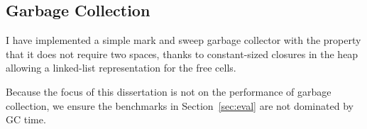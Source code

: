 \subsection{Garbage Collection}

I have implemented a simple mark and sweep garbage collector with the property
that it does not require two spaces, thanks to constant-sized closures in the
heap allowing a linked-list representation for the free cells. 

Because the focus of this dissertation is not on the performance of garbage
collection, we ensure the benchmarks in Section~\ref{sec:eval} are not dominated
by GC time.

